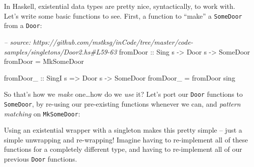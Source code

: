 \documentclass[]{article}
\newenvironment{Shaded}{}{}
\newcommand{\KeywordTok}[1]{\textcolor[rgb]{0.00,0.44,0.13}{\textbf{#1}}}
\newcommand{\DataTypeTok}[1]{\textcolor[rgb]{0.56,0.13,0.00}{#1}}
\newcommand{\CommentTok}[1]{\textcolor[rgb]{0.38,0.63,0.69}{\textit{#1}}}
\newcommand{\OtherTok}[1]{\textcolor[rgb]{0.00,0.44,0.13}{#1}}
\newcommand{\FunctionTok}[1]{\textcolor[rgb]{0.02,0.16,0.49}{#1}}
\newcommand{\NormalTok}[1]{#1}
\begin{document}
In Haskell, existential data types are pretty nice, syntactically, to work with.
Let's write some basic functions to see. First, a function to ``make'' a
\texttt{SomeDoor} from a \texttt{Door}:

\begin{Shaded}
\begin{Highlighting}[]
\CommentTok{-- source: https://github.com/mstksg/inCode/tree/master/code-samples/singletons/Door2.hs#L59-63}
\OtherTok{fromDoor ::} \DataTypeTok{Sing}\NormalTok{ s }\OtherTok{->} \DataTypeTok{Door}\NormalTok{ s }\OtherTok{->} \DataTypeTok{SomeDoor}
\NormalTok{fromDoor }\FunctionTok{=} \DataTypeTok{MkSomeDoor}

\OtherTok{fromDoor_ ::} \DataTypeTok{SingI}\NormalTok{ s }\OtherTok{=>} \DataTypeTok{Door}\NormalTok{ s }\OtherTok{->} \DataTypeTok{SomeDoor}
\NormalTok{fromDoor_ }\FunctionTok{=}\NormalTok{ fromDoor sing}
\end{Highlighting}
\end{Shaded}

So that's how we \emph{make} one\ldots{}how do we \emph{use} it? Let's port our
\texttt{Door} functions to \texttt{SomeDoor}, by re-using our pre-existing
functions whenever we can, and \emph{pattern matching} on \texttt{MkSomeDoor}:

\begin{Shaded}
\end{Shaded}

Using an existential wrapper with a singleton makes this pretty simple -- just a
simple unwrapping and re-wrapping! Imagine having to re-implement all of these
functions for a completely different type, and having to re-implement all of our
previous \texttt{Door} functions.
\end{document}
